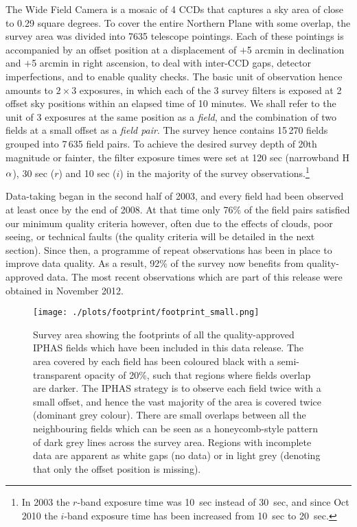 \documentclass[useAMS,usenatbib]{mn2e}
\def\ha{\mbox{H$\rm \alpha$}}
\begin{document}
The Wide Field Camera is a mosaic of 4 CCDs 
that captures a sky area of close to 0.29 square degrees.
To cover the entire Northern Plane with some overlap,
the survey area was divided into 7635 telescope pointings.
Each of these pointings is accompanied by an offset position
at a displacement of $+$5 arcmin in declination 
and $+$5 arcmin in right ascension,
to deal with inter-CCD gaps, detector imperfections,
and to enable quality checks. 
The basic unit of observation hence
amounts to $2 \times 3$ exposures, 
in which each of the 3 survey filters is exposed at 2 offset sky positions 
within an elapsed time of 10 minutes.
We shall refer to the unit of 3 exposures at the same position 
as a \emph{field},
and the combination of two fields at a small offset as a \emph{field pair}.
The survey hence contains 15\,270 fields grouped into 7\,635 field pairs.
To achieve the desired survey depth of 20th magnitude or fainter, 
the filter exposure times were set at 120 sec (narrowband \ha), 
30 sec ($r$) and 10 sec ($i$)
in the majority of the survey observations.\footnote{In 2003 
the $r$-band exposure time was 10~sec instead of 30~sec,
and since Oct 2010 the $i$-band exposure time 
has been increased from 10~sec to 20~sec.}

Data-taking began in the second half of 2003, 
and every field had been observed at least once by the end of 2008.
At that time only 76\% of the field pairs 
satisfied our minimum quality criteria however,  
often due to the effects of clouds, poor seeing, or technical faults
(the quality criteria will be detailed in the next section). 
Since then, a programme of repeat observations has been in place 
to improve data quality. 
As a result, 92\% of the survey 
now benefits from quality-approved data.
The most recent observations which are part of this release
were obtained in November 2012.

\begin{figure*}
        \texttt{[image: ./plots/footprint/footprint\_small.png]}
        \caption{Survey area showing the footprints
        of all the quality-approved IPHAS fields
        which have been included in this data release.
        The area covered by each field has been coloured black
        with a semi-transparent opacity of 20\%,
        such that regions where fields overlap are darker.
        The IPHAS strategy is to observe each field twice
        with a small offset,
        and hence the vast majority of the area 
        is covered twice (dominant grey colour).
        There are small overlaps between all the neighbouring fields
        which can be seen as a honeycomb-style pattern
        of dark grey lines across the survey area.
        Regions with incomplete data are apparent as white gaps (no data) 
        or in light grey (denoting that only the offset position is missing).}
        \label{fig:footprint}
\end{figure*}
\end{document}
